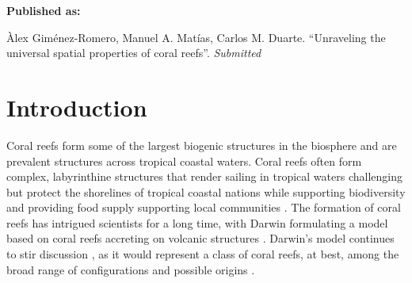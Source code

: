 




\textbf{Published as:}

\vspace{0.5cm}

\begin{center}
    Àlex Giménez-Romero, Manuel A. Matías, Carlos M. Duarte. ``Unraveling the
    universal spatial properties of coral reefs''. \textit{Submitted}
\end{center}


\newpage
\section{Introduction}

Coral reefs form some of the largest biogenic structures in the biosphere
\cite{wiener2021exploration} and are prevalent structures across tropical
coastal waters. Coral reefs often form complex, labyrinthine structures that
render sailing in tropical waters challenging but protect the shorelines of
tropical coastal nations while supporting biodiversity and providing food
supply supporting local communities \cite{Moberg1999}. The formation of coral
reefs has intrigued scientists for a long time, with Darwin formulating a model
based on coral reefs accreting on volcanic structures
\cite{darwin1874structure}. Darwin's model continues to stir discussion
\cite{Droxler2021}, as it would represent a class of coral reefs, at best,
among the broad range of configurations and possible origins
\cite{Scoffin1983}.

